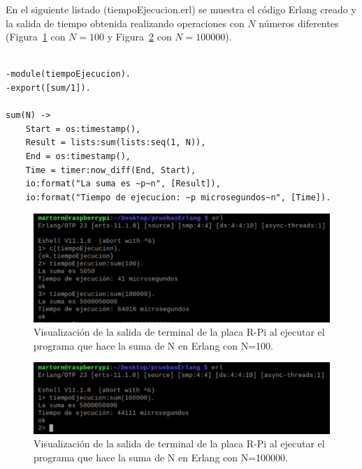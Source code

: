En el siguiente listado (tiempoEjecucion.erl) se muestra el código Erlang creado y la salida de tiempo obtenida realizando operaciones con $N$ números diferentes (Figura~\ref{fig:pruebaErlang} con $N=100$ y Figura~\ref{fig:pruebaErlang100000} con $N=100000$).\\

\lstset{language=Erlang, breaklines=true, basicstyle=\sffamily\footnotesize}
\begin{lstlisting}[frame=single, caption=tiempoEjecucion.erl]

-module(tiempoEjecucion).
-export([sum/1]).

sum(N) ->
    Start = os:timestamp(),
    Result = lists:sum(lists:seq(1, N)),
    End = os:timestamp(),
    Time = timer:now_diff(End, Start),
    io:format("La suma es ~p~n", [Result]),
    io:format("Tiempo de ejecucion: ~p microsegundos~n", [Time]).
\end{lstlisting}

\begin{figure}[h]
\centering
\includegraphics[scale=1.3]{images/pruebaErlang.png}
\caption[Salida de terminal suma de N=100 con Erlang]{Visualización de la salida de terminal de la placa R-Pi al ejecutar el programa que hace la suma de N en Erlang con N=100.}%
\label{fig:pruebaErlang}
\end{figure}

\begin{figure}[h]
\centering
\includegraphics[scale=1.3]{images/pruebaErlang100000.png}
\caption[Salida de terminal suma de N=100000 con Erlang]{Visualización de la salida de terminal de la placa R-Pi al ejecutar el programa que hace la suma de N en Erlang con N=100000.}%
\label{fig:pruebaErlang100000}
\end{figure}

